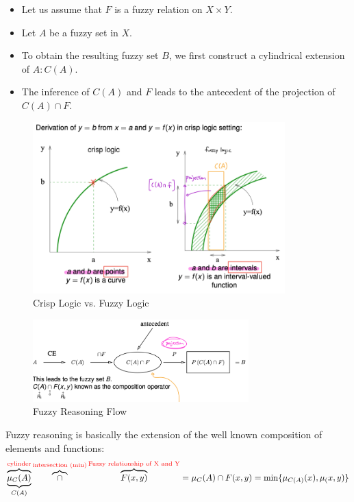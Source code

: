 \documentclass{tron}
\begin{document}
\begin{definition}{}
	\begin{itemize}
		\item Let us assume that $F$ is a fuzzy relation on $X \times Y$.
		\item Let $A$ be a fuzzy set in $X$.
		\item To obtain the resulting fuzzy set $B$, we first construct a cylindrical extension of $A: C(A)$.
		\item The inference of $C(A)$ and $F$ leads to the antecedent of the projection of $C(A)\cap F$.
	\end{itemize}
\end{definition}

\begin{figure}[H]
	\centering
	\includegraphics[height=250px]{Figs/FuzzyInferencing/fuzzy-inferencing}
	\caption{Crisp Logic vs. Fuzzy Logic}
	\label{fig:fuzzy-inf:crisp-fuzzy:ex}
\end{figure}

\begin{figure}[H]
	\centering
	\includegraphics[height=120px]{Figs/FuzzyInferencing/fuzzy-reasoning}
	\caption{Fuzzy Reasoning Flow}
	\label{fig:fuzzy-inf:flow:ex}
\end{figure}

\begin{definition}
	Fuzzy reasoning is basically the extension of the well known composition of elements and functions:
	\begin{equation}
		\overbrace{\underbrace{\mu_C(A)}_{C(A)}}^{\textcolor{red}{\text{cylinder}}} \overbrace{\cap}^{\textcolor{red}{\text{intersection (min)}}} \overbrace{F(x,y)}^{\textcolor{red}{\text{Fuzzy relationship of X and Y}}} = \mu_C(A) \cap F(x,y) = \min \{ \mu_{C(A)}(x), \mu_(x,y) \}
	\end{equation}
\end{definition}
\end{document}
